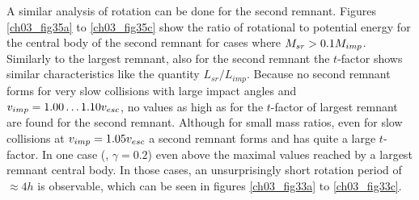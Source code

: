
A similar analysis of rotation can be done for the second remnant. Figures \ref{ch03_fig35a} to \ref{ch03_fig35c} show the ratio of rotational to potential energy for the central body of the second remnant for cases where $M_{sr} > 0.1 M_{imp}$. Similarly to the largest remnant, also for the second remnant the $t$-factor shows similar characteristics like the quantity $L_{sr} / L_{imp}$. Because no second remnant forms for very slow collisions with large impact angles and $v_{imp} = 1.00 \dots 1.10 v_{esc}$, no values as high as for the $t$-factor of largest remnant are found for the second remnant. Although for small mass ratios, even for slow collisions at $v_{imp} = 1.05 v_{esc}$ a second remnant forms and has quite a large $t$-factor. In one case (\rss, $\gamma =  0.2$) even above the maximal values reached by a largest remnant central body. In those cases, an unsurprisingly short rotation period of $\approx 4h$ is observable, which can be seen in figures \ref{ch03_fig33a} to \ref{ch03_fig33c}.


